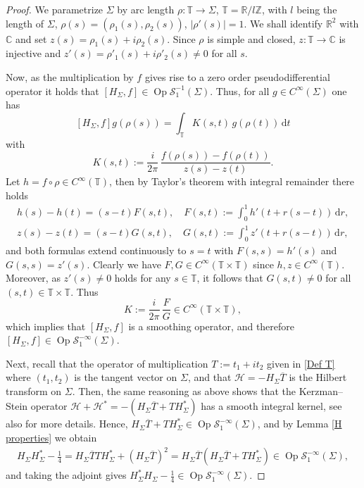 \documentclass[11pt,a4paper,reqno,oneside]{amsproc}
\DeclareMathOperator{\Op}{Op}
\newcommand{\cS}{\mathcal{S}}
\def \rr {{\mathbb R}}
\def \cc {{\mathbb C}}
\def \zz {{\mathbb Z}}
\numberwithin{equation}{section}
\def \cc {{\mathbb{C}}}
\begin{document}
\begin{proof}  
 We parametrize $\Sigma$  by arc length $\rho: \mathbb T \longrightarrow \Sigma$, $\mathbb T = \rr / l\zz$, with  $l$ being the length of $\Sigma$, $\rho(s)=(\rho_1(s),\rho_2(s))$, $|\rho'(s)|=1$. We shall identify $\rr^2$ with $\cc$ and set $z(s)=\rho_1(s)+i\rho_2(s)$. Since $\rho$ is simple and closed, $z: \mathbb T \longrightarrow \cc$ is injective and $z'(s)=\rho'_1(s)+i\rho'_2(s)\neq 0$ for all $s$.


 Now, as the multiplication by $f$ gives rise to a zero order pseudodifferential operator it holds that $ [H_\Sigma,f]\in  \Op \cS^{-1}_1(\Sigma)$. Thus, for all $g\in C^\infty(\Sigma)$ one has 
\[
 [H_\Sigma,f]g(\rho(s))=  \int_{\mathbb T} K(s,t)\,g(\rho(t))\,\mathrm{d} t
\]
with
\[
K(s,t) := \frac{i}{2\pi}\,\frac{f(\rho(s))-f(\rho(t))}{z(s)-z(t)}.
\]
Let $h= f\circ\rho \in C^\infty(\mathbb T)$, then by Taylor's theorem with
integral remainder there holds
\begin{align*}
h(s)-h(t)= (s-t)F(s,t), \quad F(s,t):= \int_0^1 h'(t+ r(s-t))\,\mathrm{d} r,\\
z(s)-z(t)= (s-t)G(s,t), \quad G(s,t):= \int_0^1 z'(t+ r(s-t))\,\mathrm{d}r,
\end{align*}
and both formulas extend continuously to $s=t$ with $F(s,s)=h'(s)$ and $G(s,s)=z'(s)$. Clearly we have $F, G\in C^\infty(\mathbb T\times \mathbb T)$ since $h, z\in C^\infty(\mathbb T)$. Moreover, as $z'(s)\neq 0$ holds for any $s\in \mathbb T$, it follows that $G(s,t)\neq 0$ for all $(s,t)\in \mathbb T\times \mathbb T$. Thus 
\[
K := \frac{i}{2\pi}\, \frac{F}{G}\in C^\infty(\mathbb T\times \mathbb T),
\]
which implies that $[H_\Sigma,f]$ is a smoothing operator, and therefore  $[H_\Sigma,f]\in  \Op \cS^{-\infty}_1(\Sigma)$.

Next, recall that the operator of multiplication $T := t_1+ it_2$ given in \eqref{Def T} where $(t_1,t_2)$ is the tangent vector on $\Sigma$, and that $\mathcal H=-H_\Sigma \overline{T}$ is the Hilbert transform on $\Sigma$. Then, the same reasoning as above shows that the Kerzman--Stein operator  $\mathcal H +\mathcal H^\ast  =-(H_\Sigma \overline{T}+ TH_\Sigma^\ast)$ has a smooth integral kernel, see also \cite[Sec. 5, p. 18]{bell} for more details. Hence, $H_\Sigma \overline{T}+ TH_\Sigma^\ast \in \Op \cS^{-\infty}_1(\Sigma)$, and by Lemma \ref{H properties} we obtain
\begin{align*}
H_\Sigma H_\Sigma^\ast -\frac{1}{4} =H_\Sigma  \overline{T} T H_\Sigma^\ast +(H_\Sigma  \overline{T} )^2= H_\Sigma  \overline{T} (H_\Sigma  \overline{T}+T H_\Sigma^\ast) \in  \Op \cS^{-\infty}_1(\Sigma),
\end{align*}
and taking the adjoint gives $H_\Sigma^\ast H_\Sigma-\frac{1}{4} \in  \Op \cS^{-\infty}_1(\Sigma)$.
\end{proof}
\end{document}
